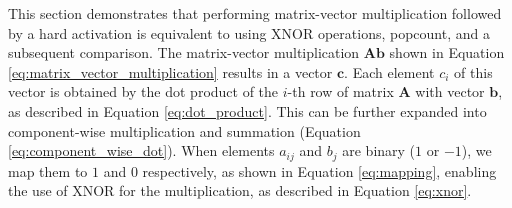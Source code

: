 \documentclass[conference]{IEEEtran}
\begin{document}
This section demonstrates that performing matrix-vector multiplication followed by a hard activation is equivalent to using XNOR operations, popcount, and a subsequent comparison.
The matrix-vector multiplication \(\mathbf{A} \mathbf{b}\) shown in Equation \ref{eq:matrix_vector_multiplication} results in a vector \(\mathbf{c}\). Each element \(c_i\) of this vector is obtained by the dot product of the \(i\)-th row of matrix \(\mathbf{A}\) with vector \(\mathbf{b}\), as described in Equation \ref{eq:dot_product}. This can be further expanded into component-wise multiplication and summation (Equation \ref{eq:component_wise_dot}). When elements \(a_{ij}\) and \(b_j\) are binary (\(1\) or \(-1\)), we map them to \(1\) and \(0\) respectively, as shown in Equation \ref{eq:mapping}, enabling the use of XNOR for the multiplication, as described in Equation \ref{eq:xnor}.
\end{document}
